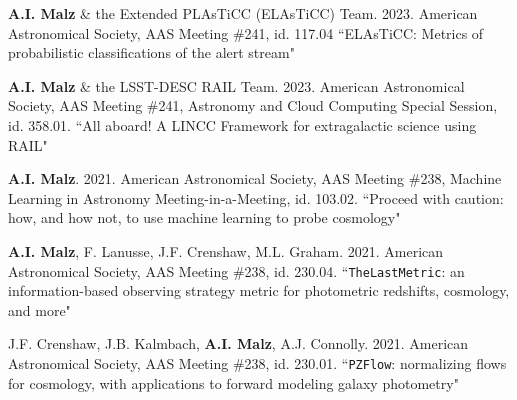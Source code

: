 {}
\nopagebreak\begin{list}{}{\malzlist}
	

	\item {\bf A.I. Malz} \& the Extended PLAsTiCC (ELAsTiCC) Team. 2023. American Astronomical Society, AAS Meeting \#241, id. 117.04 ``ELAsTiCC: Metrics of probabilistic classifications of the alert stream" 
	
	\item {\bf A.I. Malz} \& the LSST-DESC RAIL Team. 2023. American Astronomical Society, AAS Meeting \#241, Astronomy and Cloud Computing Special Session, id. 358.01. ``All aboard! A LINCC Framework for extragalactic science using RAIL" 
	
	\item {\bf A.I. Malz}. 2021. American Astronomical Society, AAS Meeting \#238, Machine Learning in Astronomy Meeting-in-a-Meeting, id. 103.02. ``Proceed with caution: how, and how not, to use machine learning to probe cosmology" 
	
	\item {\bf A.I. Malz}, F. Lanusse, J.F. Crenshaw, M.L. Graham. 2021. American Astronomical Society, AAS Meeting \#238, id. 230.04. ``\texttt{TheLastMetric}: an information-based observing strategy metric for photometric redshifts, cosmology, and more" 
	
	\item J.F. Crenshaw, J.B. Kalmbach, {\bf A.I. Malz}, A.J. Connolly. 2021. American Astronomical Society, AAS Meeting \#238, id. 230.01. ``\texttt{PZFlow}: normalizing flows for cosmology, with applications to forward modeling galaxy photometry" 
	

\end{list}
